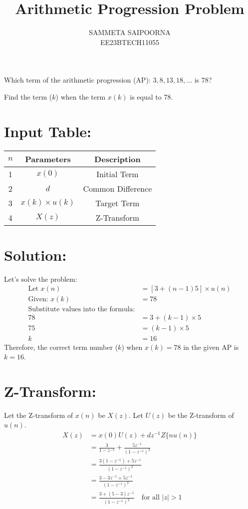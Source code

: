 \documentclass[12pt]{article}
\title{Arithmetic Progression Problem}
\author{SAMMETA SAIPOORNA \\
        EE23BTECH11055}
\date{}
\newcommand{\initialterm}{3}
\newcommand{\commondifference}{5}
\newcommand{\targetterm}{78}
\begin{document}
\maketitle

Which term of the arithmetic progression (AP): \(3, 8, 13, 18, \ldots\) is \(78\)?

Find the term (\(k\)) when the term \(x(k)\) is equal to 78.

\section{Input Table:}
\begin{center}
\begin{tabular}{|c|c|c|}
  \hline
  \(n\) & Parameters & Description \\
  \hline
  1 & \(x(0)\) & Initial Term \\
  \hline
  2 & \(d\) & Common Difference \\
  \hline
  3 & \(x(k) \times u(k)\) & Target Term \\
  \hline
  4 & \(X(z)\) & Z-Transform \\
  \hline
\end{tabular}
\end{center}

\section{Solution:}
Let's solve the problem:
\begin{align*}
\text{Let } x(n) &= [\initialterm + (n-1)\commondifference] \times u(n) \\
\text{Given: } x(k) &= \targetterm \\
\text{Substitute values into the formula:} \\
\targetterm &= \initialterm + (k-1) \times \commondifference \\
75 &= (k-1) \times 5 \\
k &= 16
\end{align*}
Therefore, the correct term number (\(k\)) when \(x(k) = 78\) in the given AP is \(k = 16\).

\section{Z-Transform:}
Let the Z-transform of \(x(n)\) be \(X(z)\). Let \(U(z)\) be the Z-transform of \(u(n)\).
\begin{align}
X(z) &= x(0)U(z) + dz^{-1}Z\{nu(n)\} \\
&= \frac{\initialterm}{1 - z^{-1}} + \frac{\commondifference z^{-1}}{(1 - z^{-1})^2} \\
&= \frac{\initialterm(1 - z^{-1}) + \commondifference z^{-1}}{(1 - z^{-1})^2} \\
&= \frac{\initialterm - \initialterm z^{-1} + \commondifference z^{-1}}{(1 - z^{-1})^2} \\
&= \frac{\initialterm + (\commondifference - \initialterm)z^{-1}}{(1 - z^{-1})^2} \quad \text{for all } |z| > 1
\end{align}
\end{document}

